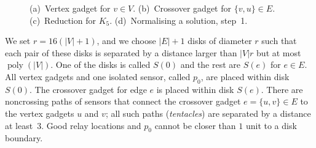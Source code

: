 \documentclass[11pt,a4paper]{article}
\newcommand{\s}[1]{{\lvert #1 \rvert}}
\DeclareMathOperator{\poly}{poly}
\theoremstyle{definition}
\theoremstyle{remark}
\begin{document}
\begin{figure}[t]
    \centering
    \caption{(a)~Vertex gadget for $v \in V$. (b)~Crossover gadget for $\{v,u\} \in E$. (c)~Reduction for $K_5$. (d)~Normalising a solution, step~1.}\label{fig:inapx}
\end{figure}

We set $r = 16(\s{V}+1)$, and we choose $\s{E}+1$ disks of diameter $r$ such that each pair of these disks is separated by a distance larger than $\s{V} r$ but at most $\poly(\s{V})$. One of the disks is called $S(0)$ and the rest are $S(e)$ for $e \in E$. All vertex gadgets and one isolated sensor, called $p_0$, are placed within disk $S(0)$. The crossover gadget for edge $e$ is placed within disk $S(e)$. There are noncrossing paths of sensors that connect the crossover gadget $e = \{u,v\} \in E$ to the vertex gadgets $u$ and $v$; all such paths (\emph{tentacles}) are separated by a distance at least~$3$. Good relay locations and $p_0$ cannot be closer than $1$ unit to a disk boundary.
\end{document}
